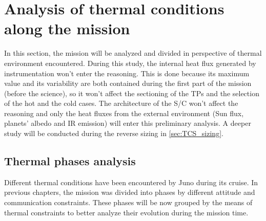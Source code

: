 \section{Analysis of thermal conditions along the mission}
\label{sec:TCS_phases}

In this section, the mission will be analyzed and divided in perspective of thermal environment encountered. During this study, the internal heat flux generated by instrumentation won't enter the reasoning.
This is done because its maximum value and its variability are both contained during the first part of the mission (before the science), so it won't affect the sectioning of the TPs and the selection of the hot and the cold cases.
The architecture of the S/C won't affect the reasoning and only the heat fluxes from the external environment (Sun flux, planets' albedo and IR emission) will enter this preliminary analysis. A deeper study will be conducted during the reverse sizing in \autoref{sec:TCS_sizing}.

\subsection{Thermal phases analysis}
\label{subsec:TP_analysis}

Different thermal conditions have been encountered by Juno during its cruise. In previous chapters, the mission was divided into phases by different attitude and communication constraints. These phases will be now grouped by the means of thermal constraints to better analyze their evolution during the mission time.

